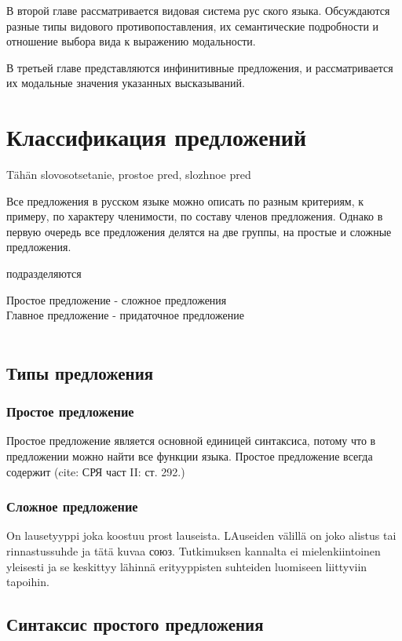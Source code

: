 \documentclass{article}
\begin{document}
В второй главе рассматривается видовая система рус ского языка. Обсуждаются разные типы видового противопоставления, их семантические подробности и отношение выбора вида к выражению модальности.  

В третьей главе представляются инфинитивные предложения, и рассматривается их модальные значения указанных высказываний.

\section{Классификация предложений}

Tähän slovosotsetanie, prostoe pred, slozhnoe pred

Все предложения в русском языке можно описать по разным критериям, к примеру, по характеру членимости, по составу членов предложения. Однако в первую очередь все предложения делятся на две группы, на простые и  сложные предложения. 

подразделяются 

Простое предложение - сложное предложения \\
Главное предложение - придаточное предложение \\
\\


\subsection{Типы предложения}

\subsubsection{Простое предложение}


Простое предложение является основной единицей синтаксиса, потому что в предложении можно найти все функции языка. Простое предложение всегда содержит  (cite: СРЯ част II: ст. 292.) 

\subsubsection{Сложное предложение}

On lausetyyppi joka koostuu prost lauseista. LAuseiden välillä on joko alistus tai rinnastussuhde ja tätä kuvaa союз. Tutkimuksen kannalta ei mielenkiintoinen yleisesti ja se keskittyy lähinnä erityyppisten suhteiden luomiseen liittyviin tapoihin. 

\subsection{Синтаксис простого предложения}
\end{document}
